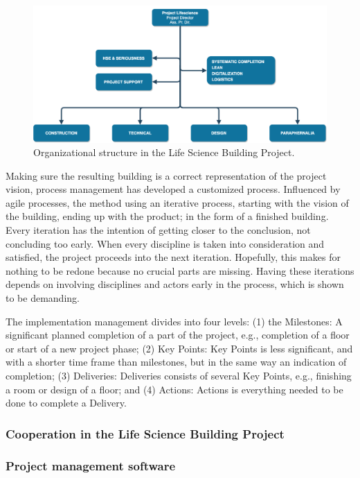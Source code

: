 \begin{figure}
    \centering
    \includegraphics[width=\textwidth]{fig/lvb_diagram.png}
    \caption{Organizational structure in the Life Science Building Project.}
    \label{fig:project_structure}
\end{figure}

Making sure the resulting building is a correct representation of the project vision, process management has developed a customized process. Influenced by agile processes, the method using an iterative process, starting with the vision of the building, ending up with the product; in the form of a finished building. Every iteration has the intention of getting closer to the conclusion, not concluding too early. When every discipline is taken into consideration and satisfied, the project proceeds into the next iteration. Hopefully, this makes for nothing to be redone because no crucial parts are missing. Having these iterations depends on involving disciplines and actors early in the process, which is shown to be demanding.

The implementation management divides into four levels: (1) the Milestones: A significant planned completion of a part of the project, e.g., completion of a floor or start of a new project phase; (2) Key Points: Key Points is less significant, and with a shorter time frame than milestones, but in the same way an indication of completion; (3) Deliveries: Deliveries consists of several Key Points, e.g., finishing a room or design of a floor; and (4) Actions: Actions is everything needed to be done to complete a Delivery. 

\subsubsection{Cooperation in the Life Science Building Project}


\subsubsection{Project management software}

